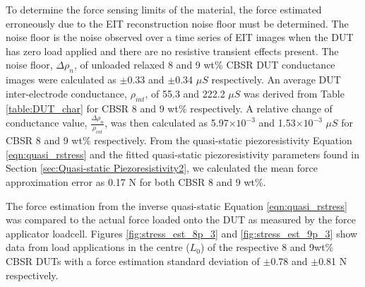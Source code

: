 To determine the force sensing limits of the material, the force estimated erroneously due to the EIT reconstruction noise floor must be determined. The noise floor is the noise observed over a time series of EIT images when the DUT has zero load applied and there are no resistive transient effects present. The noise floor, $\Delta\rho_n$, of unloaded relaxed 8 and 9 wt\% CBSR DUT conductance images were calculated as $\pm$0.33 and $\pm$0.34 $\mu S$ respectively. An average DUT inter-electrode conductance, $\rho_{int}$, of 55.3 and 222.2 $\mu S$ was derived from Table \ref{table:DUT_char} for CBSR 8 and 9 wt\% respectively. A relative change of conductance value, $\frac{\Delta\rho_{n}}{\rho_{int}}$, was then calculated as 5.97$\times10^{-3}$ and 1.53$\times10^{-3}$ $\mu S$ for CBSR 8 and 9 wt\% respectively. From the quasi-static piezoresistivity Equation \ref{eqn:quasi_rstress} and the fitted quasi-static piezoresistivity parameters found in Section \ref{sec:Quasi-static Piezoresistivity2}, we calculated the mean force approximation error as 0.17 N for both CBSR 8 and 9 wt\%.

The force estimation from the inverse quasi-static Equation \ref{eqn:quasi_rstress} was compared to the actual force loaded onto the DUT as measured by the force applicator loadcell. Figures \ref{fig:stress_est_8p_3} and \ref{fig:stress_est_9p_3} show data from load applications in the centre ($L_0$) of the respective 8 and 9wt\% CBSR DUTs with a force estimation standard deviation of $\pm$0.78 and $\pm$0.81 N respectively.

